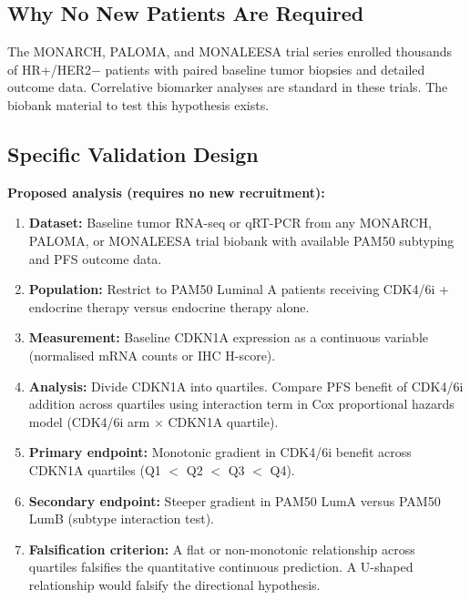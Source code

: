 \documentclass[12pt, a4paper]{article}
\begin{document}
\subsection{Why No New Patients Are Required}

The MONARCH, PALOMA, and MONALEESA trial series enrolled
thousands of HR+/HER2$-$ patients with paired baseline
tumor biopsies and detailed outcome data. Correlative
biomarker analyses are standard in these trials. The
biobank material to test this hypothesis exists.

\subsection{Specific Validation Design}

\begin{center}
\colorbox{actionbox}{
\begin{minipage}{0.88\textwidth}
\vspace{0.5em}
\textbf{Proposed analysis (requires no new recruitment):}
\begin{enumerate}[leftmargin=*, itemsep=4pt]
    \item \textbf{Dataset:} Baseline tumor RNA-seq or
    qRT-PCR from any MONARCH, PALOMA, or MONALEESA
    trial biobank with available PAM50 subtyping and
    PFS outcome data.
    \item \textbf{Population:} Restrict to PAM50 Luminal
    A patients receiving CDK4/6i + endocrine therapy
    versus endocrine therapy alone.
    \item \textbf{Measurement:} Baseline CDKN1A
    expression as a continuous variable (normalised
    mRNA counts or IHC H-score).
    \item \textbf{Analysis:} Divide CDKN1A into
    quartiles. Compare PFS benefit of CDK4/6i addition
    across quartiles using interaction term in Cox
    proportional hazards model (CDK4/6i arm $\times$
    CDKN1A quartile).
    \item \textbf{Primary endpoint:} Monotonic gradient
    in CDK4/6i benefit across CDKN1A quartiles
    (Q1 $<$ Q2 $<$ Q3 $<$ Q4).
    \item \textbf{Secondary endpoint:} Steeper gradient
    in PAM50 LumA versus PAM50 LumB (subtype
    interaction test).
    \item \textbf{Falsification criterion:} A flat or
    non-monotonic relationship across quartiles falsifies
    the quantitative continuous prediction. A U-shaped
    relationship would falsify the directional hypothesis.
\end{enumerate}
\vspace{0.4em}
\end{minipage}}
\end{center}
\end{document}
